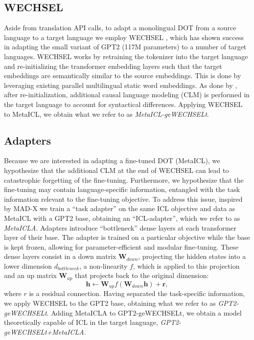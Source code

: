 \documentclass[11pt]{article}
\begin{document}
\subsection{WECHSEL}

Aside from translation API calls, to adapt a monolingual DOT from a source language to a target
language we employ WECHSEL \citep{minixhofer_wechsel_2022}, which has shown success in adapting the
small variant of GPT2 (117M parameters) to a number of target languages. WECHSEL works by retraining
the tokenizer into the target language and re-initializing the transformer embedding layers such
that the target embeddings are semantically similar to the source embeddings. This is done by
leveraging existing parallel multilingual static word embeddings. As done by
\citet{de_vries_adapting_2021}, after re-initialization, additional causal language modeling (CLM)
is performed in the target language to account for syntactical differences. Applying WECHSEL to
MetaICL, we obtain what we refer to as \textit{MetaICL-geWECHSELt}.

\subsection{Adapters}\label{sec:method:adapters}

Because we are interested in adapting a fine-tuned DOT (MetaICL), we hypothesize that the additional
CLM at the end of WECHSEL can lead to catastrophic forgetting of the fine-tuning. Furthermore, we
hypothesize that the fine-tuning may contain language-specific information, entangled with the task
information relevant to the fine-tuning objective. To address this issue, inspired by MAD-X
\citep{pfeiffer_mad-x_2020} we train a ``task adapter'' on the same ICL objective and data as
MetaICL with a GPT2 base, obtaining an ``ICL-adapter'', which we refer to as \textit{MetaICLA}.
Adapters introduce ``bottleneck'' dense layers at each transformer layer of their base. The adapter
is trained on a particular objective while the base is kept frozen, allowing for parameter-efficient
and modular fine-tuning. These dense layers consist in a down matrix $\mathbf{W}_{down}$, projecting
the hidden states into a lower dimension $d_{bottleneck}$, a non-linearity $f$, which is applied to
this projection and an up matrix $\mathbf{W}_{up}$ that projects back to the original dimension:
\begin{equation} \mathbf{h} \leftarrow \mathbf{W}_{up} f(\mathbf{W}_{down} \mathbf{h}) + \mathbf{r},
\end{equation} where $r$ is a residual connection. Having separated the task-specific information,
we apply WECHSEL to the GPT2 base, obtaining what we refer to as \textit{GPT2-geWECHSELt}. Adding
MetaICLA to GPT2-geWECHSELt, we obtain a model theoretically capable of ICL in the target language,
\textit{GPT2-geWECHSELt+MetaICLA}.
\end{document}
